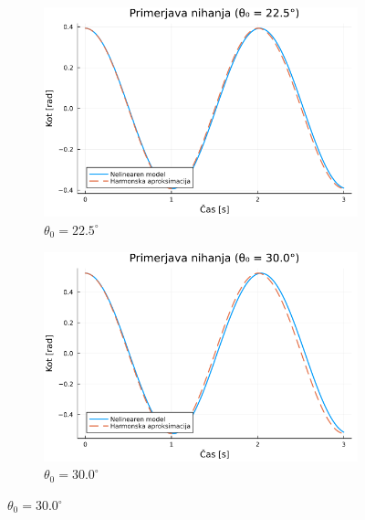 \documentclass{article}
\begin{document}
\begin{figure}[h!]
    \centering
    \begin{subfigure}[b]{0.49\textwidth}
        \includegraphics[width=\textwidth]{../slike/primerjava_0.39.png}
        \caption{$\theta_0 = 22.5^\circ$}
        \label{fig:comp22}
    \end{subfigure}
    \hfill
    \begin{subfigure}[b]{0.49\textwidth}
        \includegraphics[width=\textwidth]{../slike/primerjava_0.52.png}
        \caption{$\theta_0 = 30.0^\circ$}
        \label{fig:comp30}
    \end{subfigure}
    
    \vspace{1cm} %
    

\end{figure}
\end{document}
